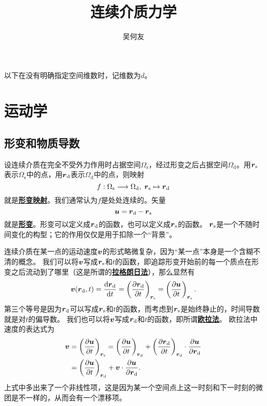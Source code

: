 \documentclass[hyperref, UTF8, a4paper]{ctexart}
\title{连续介质力学}
\author{吴何友}
\newcommand{\concept}[1]{\underline{\textbf{#1}}}
\begin{document}
\maketitle

以下在没有明确指定空间维数时，记维数为$d$。

\section{运动学}

\subsection{形变和物质导数}

设连续介质在完全不受外力作用时占据空间$\Omega_\text{s}$，经过形变之后占据空间$\Omega_\text{d}$。用$\vb*{r}_\text{s}$表示$\Omega_\text{s}$中的点，用$\vb*{r}_\text{d}$表示$\Omega_\text{d}$中的点，则映射
\[
    f: \Omega_\text{s} \longrightarrow \Omega_\text{d}, \; \vb*{r}_\text{s} \mapsto \vb*{r}_\text{d}
\]
就是\concept{形变映射}。我们通常认为$f$是处处连续的。矢量
\begin{equation}
    \vb*{u} = \vb*{r}_\text{d} - \vb*{r}_\text{s}
\end{equation}
就是\concept{形变}。形变可以定义成$\vb*{r}_\text{d}$的函数，也可以定义成$\vb*{r}_\text{s}$的函数。
$\vb*{r}_\text{s}$是一个不随时间变化的构型；它的作用仅仅是用于扣除一个“背景”。

连续介质在某一点的运动速度$\vb*{v}$的形式略微复杂，因为“某一点”本身是一个含糊不清的概念。
我们可以将$\vb*{v}$写成$\vb*{r}_\text{s}$和$t$的函数，即追踪形变开始前的每一个质点在形变之后流动到了哪里（这是所谓的\concept{拉格朗日法}），那么显然有
\begin{equation}
    \vb*{v}(\vb*{r}_\text{d}, t) = \dv{\vb*{r}_\text{d}}{t} = \left( \pdv{\vb*{r}_\text{d}}{t} \right)_{\vb*{r}_\text{s}} = \left( \pdv{\vb*{u}}{t} \right)_{\vb*{r}_\text{s}}.
\end{equation}
第三个等号是因为$\vb*{r}_\text{d}$可以写成$\vb*{r}_\text{s}$和$t$的函数，而考虑到$\vb*{r}_\text{s}$是始终静止的，时间导数就是对$t$的偏导数。
我们也可以将$\vb*{v}$写成$\vb*{r}_\text{d}$和$t$的函数，即所谓\concept{欧拉法}。
欧拉法中速度的表达式为
\begin{equation}
    \begin{aligned}
        \vb*{v} &= \left( \pdv{\vb*{u}}{t} \right)_{\vb*{r}_\text{s}} = \left( \pdv{\vb*{u}}{t} \right)_{\vb*{r}_\text{d}} + \left( \pdv{\vb*{r}_\text{d}}{t} \right)_{\vb*{r}_\text{d}} \cdot \pdv{\vb*{u}}{\vb*{r}_\text{d}} \\
        &= \left( \pdv{\vb*{u}}{t} \right)_{\vb*{r}_\text{d}} + \vb*{v} \cdot \pdv{\vb*{u}}{\vb*{r}_\text{d}}.
    \end{aligned}
\end{equation}
上式中多出来了一个非线性项，这是因为某一个空间点上这一时刻和下一时刻的微团是不一样的，从而会有一个漂移项。
\end{document}
